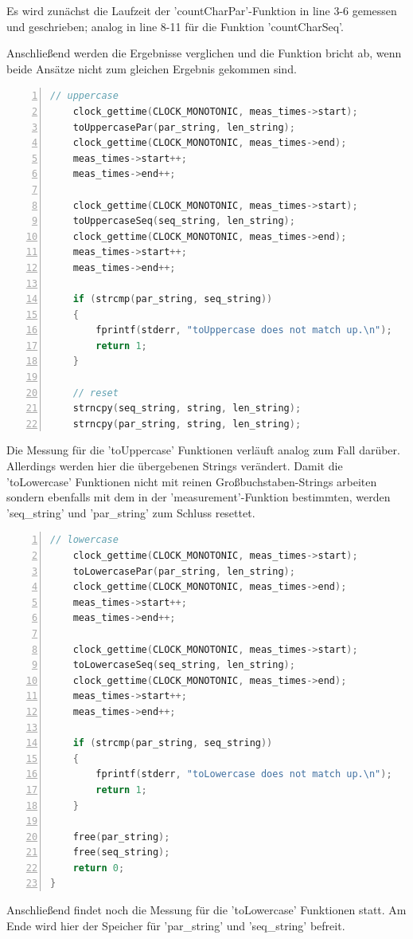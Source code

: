 \documentclass[plainarticle,zihtitle,german,final,hyperref,utf8]{zihpub}
\begin{document}
Es wird zunächst die Laufzeit der 'countCharPar'-Funktion in line 3-6 gemessen und geschrieben; analog in line 8-11 für die Funktion 'countCharSeq'.

Anschließend werden die Ergebnisse verglichen und die Funktion bricht ab, wenn beide Ansätze nicht zum gleichen Ergebnis gekommen sind.

\begin{lstlisting}[language=c, numbers=left]
	// uppercase
	clock_gettime(CLOCK_MONOTONIC, meas_times->start);	
	toUppercasePar(par_string, len_string);
	clock_gettime(CLOCK_MONOTONIC, meas_times->end);
	meas_times->start++;
	meas_times->end++;
		
	clock_gettime(CLOCK_MONOTONIC, meas_times->start);	
	toUppercaseSeq(seq_string, len_string);
	clock_gettime(CLOCK_MONOTONIC, meas_times->end);
	meas_times->start++;
	meas_times->end++;
		
	if (strcmp(par_string, seq_string))
	{
		fprintf(stderr, "toUppercase does not match up.\n");
		return 1;
	}
		
	// reset
	strncpy(seq_string, string, len_string);
	strncpy(par_string, string, len_string);
\end{lstlisting}

Die Messung für die 'toUppercase' Funktionen verläuft analog zum Fall darüber. Allerdings werden hier die übergebenen Strings verändert. Damit die 'toLowercase' Funktionen nicht mit reinen Großbuchstaben-Strings arbeiten sondern ebenfalls mit dem in der 'measurement'-Funktion bestimmten, werden 'seq\_string' und 'par\_string' zum Schluss  resettet.

\begin{lstlisting}[language=c, numbers=left]
	// lowercase
	clock_gettime(CLOCK_MONOTONIC, meas_times->start);	
	toLowercasePar(par_string, len_string);
	clock_gettime(CLOCK_MONOTONIC, meas_times->end);
	meas_times->start++;
	meas_times->end++;
		
	clock_gettime(CLOCK_MONOTONIC, meas_times->start);	
	toLowercaseSeq(seq_string, len_string);
	clock_gettime(CLOCK_MONOTONIC, meas_times->end);
	meas_times->start++;
	meas_times->end++;
		
	if (strcmp(par_string, seq_string))
	{
		fprintf(stderr, "toLowercase does not match up.\n");
		return 1;
	}
		
	free(par_string);
	free(seq_string);
	return 0;
}
\end{lstlisting}
Anschließend findet noch die Messung für die 'toLowercase' Funktionen statt.
Am Ende wird hier der Speicher für 'par\_string' und 'seq\_string' befreit.
\end{document}

